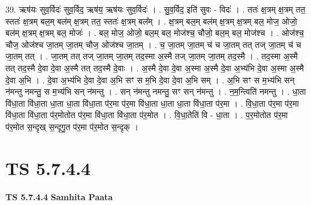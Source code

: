 \documentclass[17pt]{extarticle}
\begin{document}
39. ऋष॑यः सुव॒र्विदः॑ सुव॒र्विद॒ ऋष॑य॒ ऋष॑यः सुव॒र्विदः॑ । . सु॒व॒र्विद॒ इति॑ सुवः - विदः॑ । . ततः॑ क्ष॒त्रम् क्ष॒त्रम् तत॒ स्ततः॑ क्ष॒त्रम् बल॒म् बल॑म् क्ष॒त्रम् तत॒ स्ततः॑ क्ष॒त्रम् बल᳚म् । . क्ष॒त्रम् बल॒म् बल॑म् क्ष॒त्रम् क्ष॒त्रम् बल॒ मोज॒ ओजो॒ बल॑म् क्ष॒त्रम् क्ष॒त्रम् बल॒ मोजः॑ । . बल॒ मोज॒ ओजो॒ बल॒म् बल॒ मोज॑श्च॒ चौजो॒ बल॒म् बल॒ मोज॑श्च । . ओज॑श्च॒ चौज॒ ओज॑श्च जा॒तम् जा॒तम् चौज॒ ओज॑श्च जा॒तम् । . च॒ जा॒तम् जा॒तम् च॑ च जा॒तम् तत् तज् जा॒तम् च॑ च जा॒तम् तत् । . जा॒तम् तत् तज् जा॒तम् जा॒तम् तद॒स्मा अ॒स्मै तज् जा॒तम् जा॒तम् तद॒स्मै । . तद॒स्मा अ॒स्मै तत् तद॒स्मै दे॒वा दे॒वा अ॒स्मै तत् तद॒स्मै दे॒वाः । . अ॒स्मै दे॒वा दे॒वा अ॒स्मा अ॒स्मै दे॒वा अ॒भ्य॑भि दे॒वा अ॒स्मा अ॒स्मै दे॒वा अ॒भि । . दे॒वा अ॒भ्य॑भि दे॒वा दे॒वा अ॒भि सꣳ स म॒भि दे॒वा दे॒वा अ॒भि सम् । . अ॒भि सꣳ स म॒भ्य॑भि सन् न॑मन्तु नमन्तु॒ स म॒भ्य॑भि सन् न॑मन्तु । . सन् न॑मन्तु नमन्तु॒ सꣳ सन् न॑मन्तु । . न॒म॒न्त्विति॑ नमन्तु । . धा॒ता वि॑धा॒ता वि॑धा॒ता धा॒ता धा॒ता वि॑धा॒ता प॑र॒मा प॑र॒मा वि॑धा॒ता धा॒ता धा॒ता वि॑धा॒ता प॑र॒मा । . वि॒धा॒ता प॑र॒मा प॑र॒मा वि॑धा॒ता वि॑धा॒ता प॑र॒मोतोत प॑र॒मा वि॑धा॒ता वि॑धा॒ता प॑र॒मोत । . वि॒धा॒तेति॑ वि - धा॒ता । . प॒र॒मोतोत प॑र॒मा प॑र॒मोत स॒न्दृख् स॒न्दृगु॒त प॑र॒मा प॑र॒मोत स॒न्दृक् । \newline
\pagebreak
{}

\section{ TS 5.7.4.4 }

\textbf{TS 5.7.4.4 } \newline
\textbf{Samhita Paata} \newline
\end{document}
